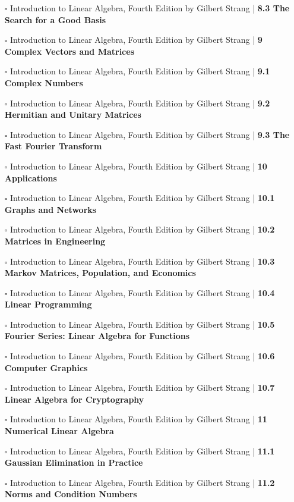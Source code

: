 \documentclass[a4, landscape, 12pt]{article}
\newcommand{\checkbox}{$\square$}%
\begin{document}
\begin{itemize}
{}
\item [\checkbox] Introduction to Linear Algebra, Fourth Edition by Gilbert Strang  | \textbf{8.3 The Search for a Good Basis
}
\item [\checkbox] Introduction to Linear Algebra, Fourth Edition by Gilbert Strang  | \textbf{9 Complex Vectors and Matrices
}
\item [\checkbox] Introduction to Linear Algebra, Fourth Edition by Gilbert Strang  | \textbf{9.1 Complex Numbers
}
\item [\checkbox] Introduction to Linear Algebra, Fourth Edition by Gilbert Strang  | \textbf{9.2 Hermitian and Unitary Matrices
}
\item [\checkbox] Introduction to Linear Algebra, Fourth Edition by Gilbert Strang  | \textbf{9.3 The Fast Fourier Transform
}
\item [\checkbox] Introduction to Linear Algebra, Fourth Edition by Gilbert Strang  | \textbf{10 Applications
}
\item [\checkbox] Introduction to Linear Algebra, Fourth Edition by Gilbert Strang  | \textbf{10.1 Graphs and Networks
}
\item [\checkbox] Introduction to Linear Algebra, Fourth Edition by Gilbert Strang  | \textbf{10.2 Matrices in Engineering
}
\item [\checkbox] Introduction to Linear Algebra, Fourth Edition by Gilbert Strang  | \textbf{10.3 Markov Matrices, Population, and Economics
}
\item [\checkbox] Introduction to Linear Algebra, Fourth Edition by Gilbert Strang  | \textbf{10.4 Linear Programming
}
\item [\checkbox] Introduction to Linear Algebra, Fourth Edition by Gilbert Strang  | \textbf{10.5 Fourier Series: Linear Algebra for Functions
}
\item [\checkbox] Introduction to Linear Algebra, Fourth Edition by Gilbert Strang  | \textbf{10.6 Computer Graphics
}
\item [\checkbox] Introduction to Linear Algebra, Fourth Edition by Gilbert Strang  | \textbf{10.7 Linear Algebra for Cryptography
}
\item [\checkbox] Introduction to Linear Algebra, Fourth Edition by Gilbert Strang  | \textbf{11 Numerical Linear Algebra
}
\item [\checkbox] Introduction to Linear Algebra, Fourth Edition by Gilbert Strang  | \textbf{11.1 Gaussian Elimination in Practice
}
\item [\checkbox] Introduction to Linear Algebra, Fourth Edition by Gilbert Strang  | \textbf{11.2 Norms and Condition Numbers
}
\end{itemize}
\end{document}
